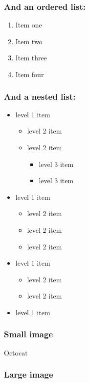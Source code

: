 \documentclass[11pt]{article}
\begin{document}
\subsubsection*{And an ordered list:}
\label{sec:orgc591dab}

\begin{enumerate}
\item Item one
\item Item two
\item Item three
\item Item four
\end{enumerate}

\subsubsection*{And a nested list:}
\label{sec:orgc0f67ca}

\begin{itemize}
\item level 1 item
\begin{itemize}
\item level 2 item
\item level 2 item
\begin{itemize}
\item level 3 item
\item level 3 item
\end{itemize}
\end{itemize}
\item level 1 item
\begin{itemize}
\item level 2 item
\item level 2 item
\item level 2 item
\end{itemize}
\item level 1 item
\begin{itemize}
\item level 2 item
\item level 2 item
\end{itemize}
\item level 1 item
\end{itemize}

\subsubsection*{Small image}
\label{sec:org0da33ea}

Octocat

\subsubsection*{Large image}
\label{sec:orgdd38fd1}
\end{document}
